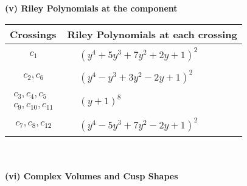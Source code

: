\documentclass[1p]{elsarticle_modified}
\theoremstyle{definition}
\begin{document}
\newpage\renewcommand{\arraystretch}{1}
\flushleft \textbf{(v) Riley Polynomials at the component}\newline \\
\begin{tabular}{m{50pt}|m{274pt}}
Crossings & \hspace{64pt}Riley Polynomials at each crossing \\
\hline $$\begin{aligned}c_{1}\end{aligned}$$&$\begin{aligned}
&(y^4+5 y^3+7 y^2+2 y+1)^2
\end{aligned}$\\
\hline $$\begin{aligned}c_{2},c_{6}\end{aligned}$$&$\begin{aligned}
&(y^4- y^3+3 y^2-2 y+1)^2
\end{aligned}$\\
\hline $$\begin{aligned}c_{3},c_{4},c_{5}\\c_{9},c_{10},c_{11}\end{aligned}$$&$\begin{aligned}
&(y+1)^8
\end{aligned}$\\
\hline $$\begin{aligned}c_{7},c_{8},c_{12}\end{aligned}$$&$\begin{aligned}
&(y^4-5 y^3+7 y^2-2 y+1)^2
\end{aligned}$\\
\hline
\end{tabular}\\~\\
\newpage\flushleft \textbf{(vi) Complex Volumes and Cusp Shapes}
\end{document}
